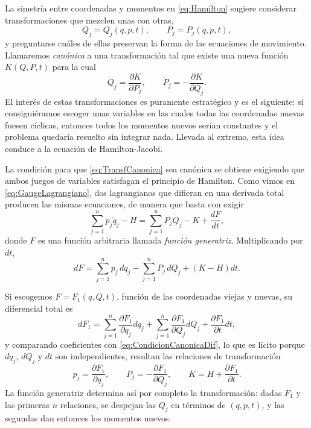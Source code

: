     La simetría entre coordenadas y momentos en \eqref{eq:Hamilton} sugiere considerar transformaciones que mezclen unas con otras,
    \begin{equation}\label{eq:TransfCanonica}
        Q_{j} = Q_{j}(q,p,t), \qquad P_{j} = P_{j}(q,p,t),
    \end{equation}
    y preguntarse cuáles de ellas preservan la forma de las ecuaciones de movimiento. Llamaremos \textit{canónica} a una transformación tal que existe una nueva función $K(Q,P,t)$ para la cual
    \begin{equation}\label{eq:HamiltonNuevas}
        \dot{Q}_{j} = \frac{\partial K}{\partial P_{j}}, \qquad \dot{P}_{j} = -\frac{\partial K}{\partial Q_{j}} .
    \end{equation}
    El interés de estas transformaciones es puramente estratégico y es el siguiente: si consiguiéramos escoger unas variables en las cuales todas las coordenadas nuevas fuesen cíclicas, entonces todos los momentos nuevos serían constantes y el problema quedaría resuelto sin integrar nada. Llevada al extremo, esta idea conduce a la ecuación de Hamilton-Jacobi.

    La condición para que \eqref{eq:TransfCanonica} sea canónica se obtiene exigiendo que ambos juegos de variables satisfagan el principio de Hamilton. Como vimos en \eqref{eq:GaugeLagrangiano}, dos lagrangianos que difieran en una derivada total producen las mismas ecuaciones, de manera que basta con exigir
    \begin{equation}\label{eq:CondicionCanonica}
        \sum_{j=1}^{n}p_{j}\dot{q}_{j} - H = \sum_{j=1}^{n}P_{j}\dot{Q}_{j} - K + \frac{dF}{dt},
    \end{equation}
    donde $F$ es una función arbitraria llamada \textit{función generatriz}. Multiplicando por $dt$,
    \begin{equation}\label{eq:CondicionCanonicaDif}
        dF = \sum_{j=1}^{n}p_{j}\,dq_{j} - \sum_{j=1}^{n}P_{j}\,dQ_{j} + \left(K - H\right)dt .
    \end{equation}

    Si escogemos $F = F_{1}(q,Q,t)$, función de las coordenadas viejas y nuevas, su diferencial total es
    \begin{equation}\label{eq:DiferencialF1}
        dF_{1} = \sum_{j=1}^{n}\frac{\partial F_{1}}{\partial q_{j}}dq_{j} + \sum_{j=1}^{n}\frac{\partial F_{1}}{\partial Q_{j}}dQ_{j} + \frac{\partial F_{1}}{\partial t}dt,
    \end{equation}
    y comparando coeficientes con \eqref{eq:CondicionCanonicaDif}, lo que es lícito porque $dq_{j}$, $dQ_{j}$ y $dt$ son independientes, resultan las relaciones de transformación
    \begin{equation}\label{eq:RelacionesF1}
        p_{j} = \frac{\partial F_{1}}{\partial q_{j}},
        \qquad
        P_{j} = -\frac{\partial F_{1}}{\partial Q_{j}},
        \qquad
        K = H + \frac{\partial F_{1}}{\partial t} .
    \end{equation}
    La función generatriz determina así por completo la transformación: dadas $F_{1}$ y las primeras $n$ relaciones, se despejan las $Q_{j}$ en términos de $(q,p,t)$, y las segundas dan entonces los momentos nuevos.

